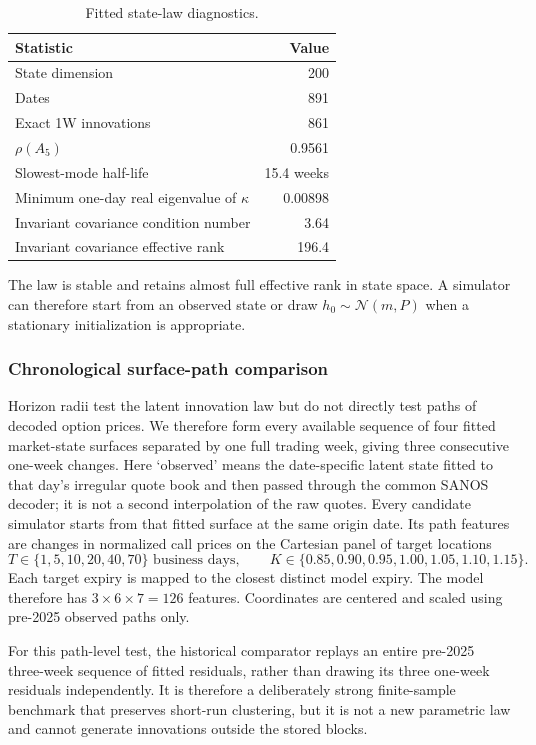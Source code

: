 \documentclass[11pt,a4paper]{article}
\begin{document}
\begin{table}[H]
\centering
\begin{tabular}{lr}
\toprule
Statistic & Value\\
\midrule
State dimension & 200\\
Dates & 891\\
Exact 1W innovations & 861\\
$\rho(A_5)$ & 0.9561\\
Slowest-mode half-life & 15.4 weeks\\
Minimum one-day real eigenvalue of $\kappa$ & 0.00898\\
Invariant covariance condition number & 3.64\\
Invariant covariance effective rank & 196.4\\
\bottomrule
\end{tabular}
\caption{Fitted state-law diagnostics.}
\label{tab:stability}
\end{table}

The law is stable and retains almost full effective rank in state space.  A
simulator can therefore start from an observed state or draw
$h_0\sim\mathcal N(m,P)$ when a stationary initialization is appropriate.



\subsubsection{Chronological surface-path comparison}
\label{sec:path-realism}

Horizon radii test the latent innovation law but do not directly test paths
of decoded option prices.  We therefore form every available sequence of four
fitted market-state surfaces separated by one full trading week, giving three
consecutive one-week changes.  Here `observed' means the date-specific latent
state fitted to that day's irregular quote book and then passed through the
common SANOS decoder; it is not a second interpolation of the raw quotes.
Every candidate simulator starts from that fitted surface at the same origin
date.  Its path features are changes in normalized call prices on
the Cartesian panel of target locations
\[
  T\in\{1,5,10,20,40,70\}\text{ business days},
  \qquad
  K\in\{0.85,0.90,0.95,1.00,1.05,1.10,1.15\}.
\]
Each target expiry is mapped to the closest distinct model expiry.  The
model therefore has $3\times6\times7=126$ features.  Coordinates are centered
and scaled using pre-2025 observed paths only.

For this path-level test, the historical comparator replays an entire
pre-2025 three-week sequence of fitted residuals, rather than drawing its
three one-week residuals independently.  It is therefore a deliberately strong
finite-sample benchmark that preserves short-run clustering, but it is not a
new parametric law and cannot generate innovations outside the stored blocks.
\end{document}

